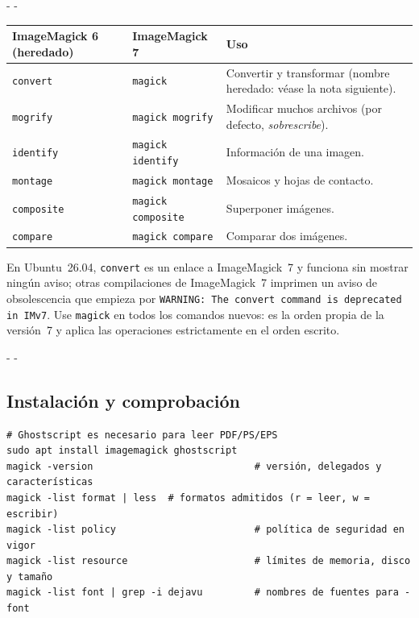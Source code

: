 \documentclass[11pt,a4paper]{article}
\makeatletter
\newcommand{\necesitaespacio}[1]{\par\penalty-100\begingroup
	\setlength{\dimen@}{#1}\dimen@ii\pagegoal\advance\dimen@ii-\pagetotal
	\ifdim\dimen@>\dimen@ii\ifdim\dimen@ii>\z@\vfil\fi\penalty-\@M\fi\endgroup}
\newcommand{\cmd}[1]{\texttt{\textcolor{colcmd}{#1}}}      %
\newcommand{\cab}[1]{\textbf{#1}}
\makeatother
\begin{document}
	\begingroup\small
	\necesitaespacio{16\baselineskip}
	\begin{longtable}{L{4.2cm}L{5.0cm}L{5.86cm}}
		\toprule{}\cab{ImageMagick 6 (heredado)} & \cab{ImageMagick 7} & \cab{Uso}\\\midrule
		\endfirsthead
		\bottomrule
		\endfoot
		\cmd{convert} & \cmd{magick} & Convertir y transformar (nombre heredado: véase la nota siguiente).\\*
		\cmd{mogrify} & \cmd{magick mogrify} & Modificar muchos archivos (por defecto, \emph{sobrescribe}).\\
		\cmd{identify} & \cmd{magick identify} & Información de una imagen.\\
		\cmd{montage} & \cmd{magick montage} & Mosaicos y hojas de contacto.\\
		\cmd{composite} & \cmd{magick composite} & Superponer imágenes.\\*
		\cmd{compare} & \cmd{magick compare} & Comparar dos imágenes.\\
	\end{longtable}
	\endgroup
	
	\begin{nota}
		En Ubuntu~26.04, \cmd{convert} es un enlace a ImageMagick~7 y funciona sin mostrar ningún aviso; otras compilaciones de ImageMagick~7 imprimen un aviso de obsolescencia que empieza por \texttt{WARNING: The convert command is deprecated in IMv7}. Use \cmd{magick} en todos los comandos nuevos: es la orden propia de la versión~7 y aplica las operaciones estrictamente en el orden escrito.
	\end{nota}
	
	\necesitaespacio{8\baselineskip}
	\subsection{Instalación y comprobación}
	
	\begin{lstlisting}
# Ghostscript es necesario para leer PDF/PS/EPS
sudo apt install imagemagick ghostscript
magick -version                            # versión, delegados y características
magick -list format | less  # formatos admitidos (r = leer, w = escribir)
magick -list policy                        # política de seguridad en vigor
magick -list resource                      # límites de memoria, disco y tamaño
magick -list font | grep -i dejavu         # nombres de fuentes para -font
\end{lstlisting}
	
\end{document}
